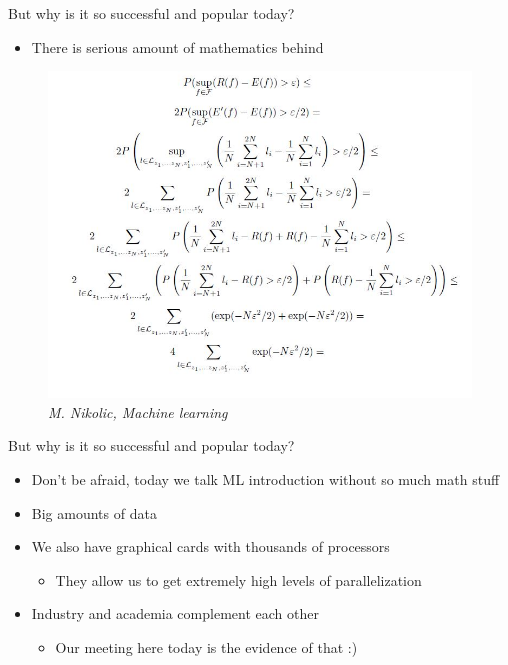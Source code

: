 \documentclass[aspectratio=169]{beamer}
\begin{document}
\begin{frame}{But why is it so successful and popular today?}
    \begin{itemize}
        \item There is serious amount of mathematics behind \cite{Murphy, Bishop, tibshirani, shalev-schwartz, vapnik}
    \end{itemize}
     \begin{center}
        \begin{figure}
            \includegraphics[scale=0.35]{./images/math.JPG}
            \caption{\textit{M. Nikolic, Machine learning}}
        \end{figure}
    \end{center}
\end{frame}
\begin{frame}{But why is it so successful and popular today?}
    \begin{itemize}
        \item Don't be afraid, today we talk ML introduction without so much math stuff
        \item Big amounts of data
        \item We also have graphical cards with thousands of processors
        \begin{itemize}
            \item They allow us to get extremely high levels of parallelization
        \end{itemize}
        \item Industry and academia complement each other
        \begin{itemize}
            \item Our meeting here today is the evidence of that :)
        \end{itemize}
    \end{itemize}
\end{frame}
\end{document}

